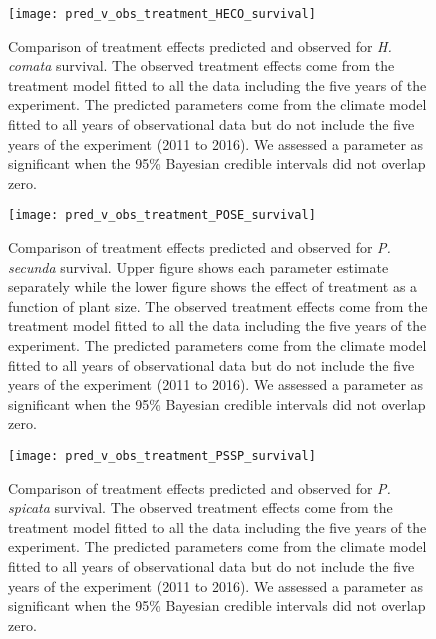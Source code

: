 \documentclass[11pt]{article}
\begin{document}
\begin{figure}[!htbp]
	\centering
	\texttt{[image: pred\_v\_obs\_treatment\_HECO\_survival]}
	\caption{Comparison of treatment effects predicted and observed for \textit{H. comata} survival.  The observed treatment effects come from the treatment model fitted to all the data including the five years of the experiment.  The predicted parameters come from the climate model fitted to all years of observational data but do not include the five years of the experiment (2011 to 2016). We assessed a parameter as significant when the 95\% Bayesian credible intervals did not overlap zero.}
	\label{fig:parPredHECOSurvival}
\end{figure}


\begin{figure}[!htbp]
	\centering
	\texttt{[image: pred\_v\_obs\_treatment\_POSE\_survival]}
	\caption{Comparison of treatment effects predicted and observed for \textit{P. secunda} survival.  Upper figure shows each parameter estimate separately while the lower figure shows the effect of treatment as a function of plant size.  The observed treatment effects come from the treatment model fitted to all the data including the five years of the experiment.  The predicted parameters come from the climate model fitted to all years of observational data but do not include the five years of the experiment (2011 to 2016). We assessed a parameter as significant when the 95\% Bayesian credible intervals did not overlap zero.}
	\label{fig:parPredPOSESurvival}
\end{figure}

\begin{figure}[!htbp]
	\centering
	\texttt{[image: pred\_v\_obs\_treatment\_PSSP\_survival]}
	\caption{Comparison of treatment effects predicted and observed for \textit{P. spicata} survival.  The observed treatment effects come from the treatment model fitted to all the data including the five years of the experiment.  The predicted parameters come from the climate model fitted to all years of observational data but do not include the five years of the experiment (2011 to 2016). We assessed a parameter as significant when the 95\% Bayesian credible intervals did not overlap zero.}
	\label{fig:parPredPSSPSurvival}
\end{figure}
\end{document}
